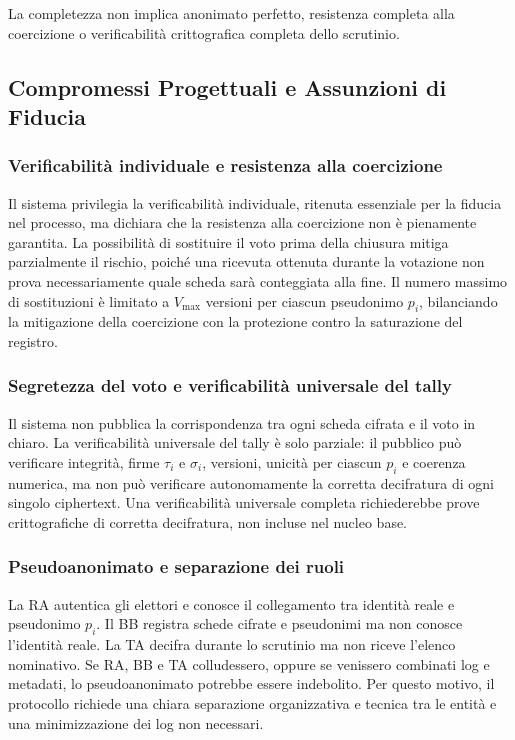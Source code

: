 \documentclass[12pt,a4paper]{article}
\begin{document}
La completezza non implica anonimato perfetto, resistenza completa alla coercizione o verificabilit\`a crittografica completa dello scrutinio.

\subsection{Compromessi Progettuali e Assunzioni di Fiducia}

\subsubsection*{Verificabilit\`a individuale e resistenza alla coercizione}

Il sistema privilegia la verificabilit\`a individuale, ritenuta essenziale per la fiducia nel processo, ma dichiara che la resistenza alla coercizione non \`e pienamente garantita. La possibilit\`a di sostituire il voto prima della chiusura mitiga parzialmente il rischio, poich\'e una ricevuta ottenuta durante la votazione non prova necessariamente quale scheda sar\`a conteggiata alla fine. Il numero massimo di sostituzioni \`e limitato a $V_{\max}$ versioni per ciascun pseudonimo $p_i$, bilanciando la mitigazione della coercizione con la protezione contro la saturazione del registro.

\subsubsection*{Segretezza del voto e verificabilit\`a universale del tally}

Il sistema non pubblica la corrispondenza tra ogni scheda cifrata e il voto in chiaro. La verificabilit\`a universale del tally \`e solo parziale: il pubblico pu\`o verificare integrit\`a, firme $\tau_i$ e $\sigma_i$, versioni, unicit\`a per ciascun $p_i$ e coerenza numerica, ma non pu\`o verificare autonomamente la corretta decifratura di ogni singolo ciphertext. Una verificabilit\`a universale completa richiederebbe prove crittografiche di corretta decifratura, non incluse nel nucleo base.

\subsubsection*{Pseudoanonimato e separazione dei ruoli}

La RA autentica gli elettori e conosce il collegamento tra identit\`a reale e pseudonimo $p_i$. Il BB registra schede cifrate e pseudonimi ma non conosce l'identit\`a reale. La TA decifra durante lo scrutinio ma non riceve l'elenco nominativo. Se RA, BB e TA colludessero, oppure se venissero combinati log e metadati, lo pseudoanonimato potrebbe essere indebolito. Per questo motivo, il protocollo richiede una chiara separazione organizzativa e tecnica tra le entit\`a e una minimizzazione dei log non necessari.
\end{document}
